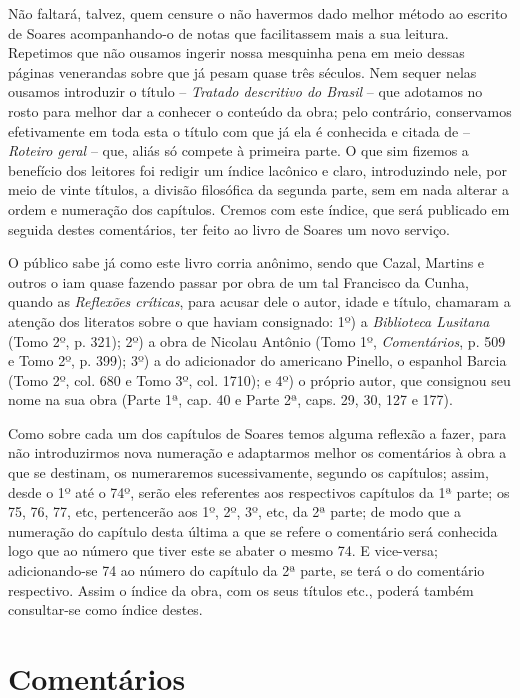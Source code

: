 Não faltará, talvez, quem censure o não havermos dado melhor 
método ao escrito de Soares acompanhando-o de notas que facilitassem 
mais a sua leitura. Repetimos que não ousamos ingerir nossa 
mesquinha pena em meio dessas páginas venerandas sobre que já 
pesam quase três séculos. Nem sequer nelas ousamos introduzir o título 
-- \textit{Tratado descritivo do Brasil} -- que adotamos no rosto para melhor 
dar a conhecer o conteúdo da obra; pelo contrário, conservamos 
efetivamente em toda esta o título com que já ela é conhecida e citada de 
-- \textit{Roteiro geral} -- que, aliás só compete à primeira parte. O que sim 
fizemos a benefício dos leitores foi redigir um índice lacônico e claro, 
introduzindo nele, por meio de vinte títulos, a divisão filosófica da 
segunda parte, sem em nada alterar a ordem e numeração dos capítulos. 
Cremos com este índice, que será publicado em seguida destes 
comentários, ter feito ao livro de Soares um novo serviço.

O público sabe já como este livro corria anônimo, sendo que Cazal, 
Martins e outros o iam quase fazendo passar por obra de um tal 
Francisco da Cunha, quando as \textit{Reflexões críticas}, para acusar dele o 
autor, idade e título, chamaram a atenção dos literatos sobre o que 
haviam consignado: 1º) a \textit{Biblioteca Lusitana} (Tomo 2º, p. 321); 2º) a 
obra de Nicolau Antônio (Tomo 1º, \textit{Comentários},
p. 509 e Tomo 2º, p. 399); 3º) a do adicionador do americano Pinello, 
o espanhol Barcia (Tomo 2º, col. 680 e Tomo 3º, col. 1710); e 4º) o 
próprio autor, que consignou seu nome na sua obra (Parte 1ª, cap. 40 e 
Parte 2ª, caps. 29, 30, 127 e 177).

Como sobre cada um dos capítulos de Soares temos alguma 
reflexão a fazer, para não introduzirmos nova numeração e adaptarmos 
melhor os comentários à obra a que se destinam, os numeraremos 
sucessivamente, segundo os capítulos; assim, desde o 1º até o 74º, 
serão eles referentes aos respectivos capítulos da 1ª parte; os 75, 76, 77, 
etc, pertencerão aos 1º, 2º, 3º, etc, da 2ª parte; de modo que a 
numeração do capítulo desta última a que se refere o comentário será 
conhecida logo que ao número que tiver este se abater o mesmo 74. E 
vice-versa; adicionando-se 74 ao número do capítulo da 2ª parte, se 
terá o do comentário respectivo. Assim o índice da obra, com os seus 
títulos etc., poderá também consultar-se como índice destes.

\section{Comentários}
\medskip

